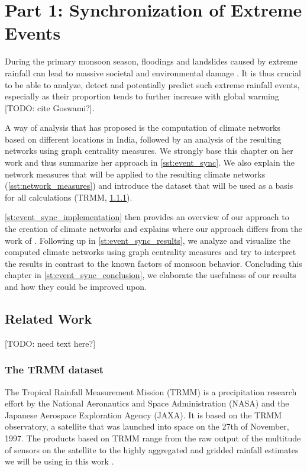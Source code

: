 \chapter{Part 1: Synchronization of Extreme Events}
\label{c:event_sync}
During the primary monsoon season, floodings and landslides caused by extreme rainfall can lead to massive societal and environmental damage \citep{Stolbova.2015}. It is thus crucial to be able to analyze, detect and potentially predict such extreme rainfall events, especially as their proportion tends to further increase with global warming \citep{Stolbova.2015} [TODO: cite Goswami?].

A way of analysis that \citet{Stolbova.2015} has proposed is the computation of climate networks based on different locations in India, followed by an analysis of the resulting networks using graph centrality measures. We strongly base this chapter on her work and thus summarize her approach in \cref{sst:event_sync}. We also explain the network measures that will be applied to the resulting climate networks (\cref{sst:network_measures}) and introduce the dataset that will be used as a basis for all calculations (TRMM, \cref{sst:trmm_dataset}).

\cref{st:event_sync_implementation} then provides an overview of our approach to the creation of climate networks and explains where our approach differs from the work of \citep{Stolbova.2015}. Following up in \cref{st:event_sync_results}, we analyze and visualize the computed climate networks using graph centrality measures and try to interpret the results in contrast to the known factors of monsoon behavior. Concluding this chapter in \cref{st:event_sync_conclusion}, we elaborate the usefulness of our results and how they could be improved upon.

\section{Related Work}
[TODO: need text here?]

\subsection{The TRMM dataset}
\label{sst:trmm_dataset}
The Tropical Rainfall Measurement Mission (TRMM) is a precipitation research effort by the National Aeronautics and Space Administration (NASA) and the Japanese Aerospace Exploration Agency (JAXA). It is based on the TRMM observatory, a satellite that was launched into space on the 27th of November, 1997. The products based on TRMM range from the raw output of the multitude of sensors on the satellite to the highly aggregated and gridded rainfall estimates we will be using in this work \citep{GoddardEarthScienceDataInformationandServicesCenter.2016}.

